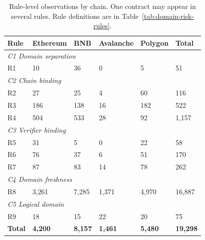 \documentclass[10pt,conference]{IEEEtran}
\begin{document}
\begin{table}[tb]
\centering
\scriptsize
\caption{Rule-level observations by chain. One contract may appear in several rules. Rule definitions are in Table~\ref{tab:domain-risk-rules}.}
\label{tab:taxonomy-by-chain}
\renewcommand{\arraystretch}{1.05}
\setlength{\tabcolsep}{1.6pt}
\begin{tabular}{p{2cm}p{1cm}p{1.1cm}p{1.1cm}p{1.1cm}p{1.1cm}}
\toprule
\textbf{Rule} & \textbf{Ethereum} & \textbf{BNB} & \textbf{Avalanche} & \textbf{Polygon} & \textbf{Total} \\
\midrule
\multicolumn{6}{l}{\emph{C1 Domain separation}} \\
R1 & 10 & 36 & 0 & 5 & 51 \\
\multicolumn{6}{l}{\emph{C2 Chain binding}} \\
R2 & 27 & 25 & 4 & 60 & 116 \\
R3 & 186 & 138 & 16 & 182 & 522 \\
R4 & 504 & 533 & 28 & 92 & 1{,}157 \\
\multicolumn{6}{l}{\emph{C3 Verifier binding}} \\
R5 & 31 & 5 & 0 & 22 & 58 \\
R6 & 76 & 37 & 6 & 51 & 170 \\
R7 & 87 & 83 & 14 & 78 & 262 \\
\multicolumn{6}{l}{\emph{C4 Domain freshness}} \\
R8 & 3{,}261 & 7{,}285 & 1{,}371 & 4{,}970 & 16{,}887 \\
\multicolumn{6}{l}{\emph{C5 Logical domain}} \\
R9 & 18 & 15 & 22 & 20 & 75 \\
\midrule
\textbf{Total} & \textbf{4{,}200} & \textbf{8{,}157} & \textbf{1{,}461} & \textbf{5{,}480} & \textbf{19{,}298} \\
\bottomrule
\end{tabular}
\end{table}
\end{document}
